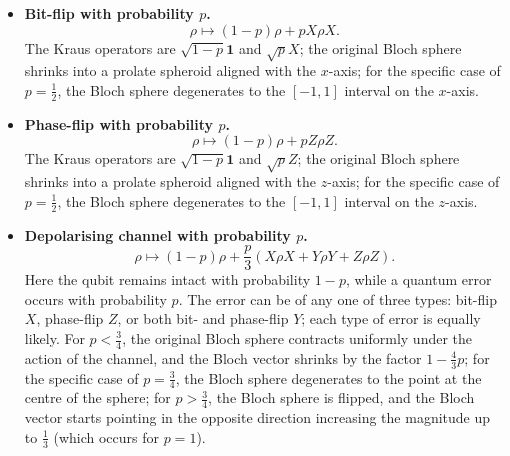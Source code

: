 \documentclass[fleqn,a4paper]{article}
\theoremstyle{definition}
\theoremstyle{definition}
\theoremstyle{definition}
\theoremstyle{definition}
\theoremstyle{remark}
\begin{document}
\begin{itemize}
\item
  \textbf{Bit-flip with probability \(p\).}
  \[
      \rho \longmapsto (1-p)\rho+pX\rho X.
    \]
  The Kraus operators are \(\sqrt{1-p}\mathbf{1}\) and \(\sqrt{p}X\);
  the original Bloch sphere shrinks into a prolate spheroid aligned with the \(x\)-axis;
  for the specific case of \(p=\frac{1}{2}\), the Bloch sphere degenerates to the \([-1,1]\) interval on the \(x\)-axis.
\item
  \textbf{Phase-flip with probability \(p\).}
  \[
      \rho \longmapsto (1-p)\rho+pZ\rho Z.
    \]
  The Kraus operators are \(\sqrt{1-p}\mathbf{1}\) and \(\sqrt{p}Z\);
  the original Bloch sphere shrinks into a prolate spheroid aligned with the \(z\)-axis;
  for the specific case of \(p=\frac{1}{2}\), the Bloch sphere degenerates to the \([-1,1]\) interval on the \(z\)-axis.
\item
  \textbf{Depolarising channel with probability \(p\).}
  \[
      \rho\longmapsto (1-p)\rho + \frac{p}{3}\left(X\rho X+Y\rho Y+Z\rho Z\right).
    \]
  Here the qubit remains intact with probability \(1-p\), while a quantum error occurs with probability \(p\).
  The error can be of any one of three types: bit-flip \(X\), phase-flip \(Z\), or both bit- and phase-flip \(Y\); each type of error is equally likely.
  For \(p<\frac{3}{4}\), the original Bloch sphere contracts uniformly under the action of the channel, and the Bloch vector shrinks by the factor \(1-\frac{4}{3}p\);
  for the specific case of \(p=\frac{3}{4}\), the Bloch sphere degenerates to the point at the centre of the sphere;
  for \(p>\frac{3}{4}\), the Bloch sphere is flipped, and the Bloch vector starts pointing in the opposite direction increasing the magnitude up to \(\frac{1}{3}\) (which occurs for \(p=1\)).
\end{itemize}
\end{document}
